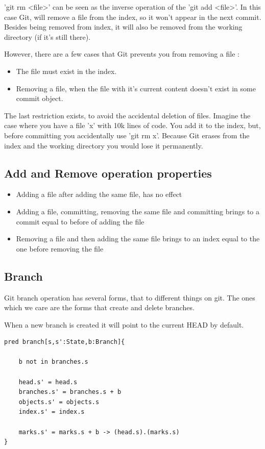 \pagebreak

'git rm <file>' can be seen as the inverse operation of the 'git add <file>'.
In this case Git, will remove a file from the index, so it won't appear in the
next commit. Besides being removed from index, it will also be removed from the 
working directory (if it's still there). \par
However, there are a few cases that Git prevents you from removing a file : 
\begin{itemize}
\item The file must exist in the index.
\item Removing a file, when the file with it's current content 
doesn't exist in some commit object.
\end{itemize}
The last restriction exists, to avoid the accidental deletion of files. Imagine the
case where you have a file 'x' with 10k lines of code. You add it to the index,
but, before committing you accidentally use 'git rm x'. Because Git erases from
the index and the working directory you would lose it permanently.

\subsection{Add and Remove operation properties}

\begin{itemize}
	\item Adding a file after adding the same file, has no effect
	\item Adding a file, committing, removing the same file and 
	committing brings to a commit equal to before of adding the file
	\item Removing a file and then adding the same file brings to an
	index equal to the one before removing the file
\end{itemize}

\subsection{Branch}

Git branch operation has several forms, that to different things on git.
The ones which we care are the forms that create and delete branches. \par
When a new branch is created it will point to the current HEAD by default.
\par

\begin{lstlisting}
pred branch[s,s':State,b:Branch]{
	
	b not in branches.s

	head.s' = head.s
	branches.s' = branches.s + b
	objects.s' = objects.s
	index.s' = index.s

	marks.s' = marks.s + b -> (head.s).(marks.s)
}
\end{lstlisting}

